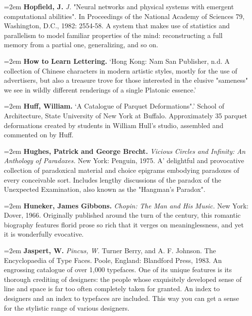 \par\noindent\hangindent=2em {\bf Hopfield, J.} {\it J.} "Neural networks and physical systems with emergent computational abilities". In Proceedings of the National Academy of Sciences 79, Washington, D.C., 1982: 2554-58. A system that makes use of statistics and parallelism to model familiar properties of the mind: reconstructing a full memory from a partial one, generalizing, and so on.

\par\noindent\hangindent=2em {\bf How to Learn Lettering.} `Hong Kong: Nam San Publisher, n.d. A collection of Chinese characters in modern artistic styles, mostly for the use of advertisers, but also a treasure trove for those interested in the elusive "sameness" we see in wildly different renderings of a single Platonic essence.' 

\par\noindent\hangindent=2em {\bf Huff, William.} `A Catalogue of Parquet Deformations".' School of Architecture, State University of New York at Buffalo. Approximately 35 parquet deformations created by students in William Hull's studio, assembled and commented on by Huff.

\par\noindent\hangindent=2em {\bf Hughes, Patrick and George Brecht.} {\it Vicious Circles and Infinity: An Anthology of Paradoxes.} New York: Penguin, 1975. A' delightful and provocative collection of paradoxical material and choice epigrams embodying paradoxes of every conceivable sort. Includes lengthy discussions of the paradox of the Unexpected Examination, also known as the "Hangman's Paradox".

\par\noindent\hangindent=2em {\bf Huneker, James Gibbons.} {\it Chopin: The Man and His Music.} New York: Dover, 1966. Originally published around the turn of the century, this romantic biography features florid prose so rich that it verges on meaninglessness, and yet it is wonderfully evocative.

\par\noindent\hangindent=2em {\bf Jaspert, W.} {\it Pincus, W.} Turner Berry, and A. F. Johnson. The Encyclopaedia of Type Faces. Poole, England: Blandford Press, 1983. An engrossing catalogue of over 1,000 typefaces. One of its unique features is its thorough crediting of designers: the people whose exquisitely developed sense of line and space is far too often completely taken for granted. An index to designers and an index to typefaces are included. This way you can get a sense for the stylistic range of various designers.

